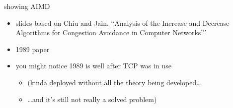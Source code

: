 \usetikzlibrary{arrows.meta,calc,shapes}
\begin{frame}{showing AIMD}
    \begin{itemize}
    \item slides based on Chiu and Jain, ``Analysis of the Increase and Decrease Algorithms for Congestion Avoidance in Computer Networks'''
    \item 1989 paper
    \vspace{.5cm}
    \item you might notice 1989 is well after TCP was in use
        \begin{itemize}
        \item (kinda deployed without all the theory being developed\ldots
        \item \ldots and it's still not really a solved problem)
        \end{itemize}
    \end{itemize}
\end{frame}

